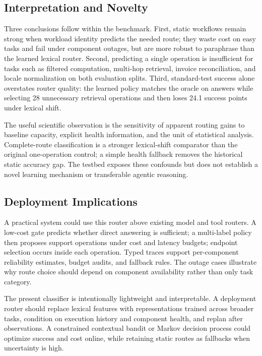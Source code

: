 \documentclass[letterpaper]{article} %
\begin{document}
\subsection{Interpretation and Novelty}

Three conclusions follow within the benchmark. First, static workflows remain strong when workload identity predicts the needed route; they waste cost on easy tasks and fail under component outages, but are more robust to paraphrase than the learned lexical router. Second, predicting a single operation is insufficient for tasks such as filtered computation, multi-hop retrieval, invoice reconciliation, and locale normalization on both evaluation splits. Third, standard-test success alone overstates router quality: the learned policy matches the oracle on answers while selecting 28 unnecessary retrieval operations and then loses 24.1 success points under lexical shift.

The useful scientific observation is the sensitivity of apparent routing gains to baseline capacity, explicit health information, and the unit of statistical analysis. Complete-route classification is a stronger lexical-shift comparator than the original one-operation control; a simple health fallback removes the historical static accuracy gap. The testbed exposes these confounds but does not establish a novel learning mechanism or transferable agentic reasoning.

\subsection{Deployment Implications}

A practical system could use this router above existing model and tool routers. A low-cost gate predicts whether direct answering is sufficient; a multi-label policy then proposes support operations under cost and latency budgets; endpoint selection occurs inside each operation. Typed traces support per-component reliability estimates, budget audits, and fallback rules. The outage cases illustrate why route choice should depend on component availability rather than only task category.

The present classifier is intentionally lightweight and interpretable. A deployment router should replace lexical features with representations trained across broader tasks, condition on execution history and component health, and replan after observations. A constrained contextual bandit or Markov decision process could optimize success and cost online, while retaining static routes as fallbacks when uncertainty is high.
\end{document}
